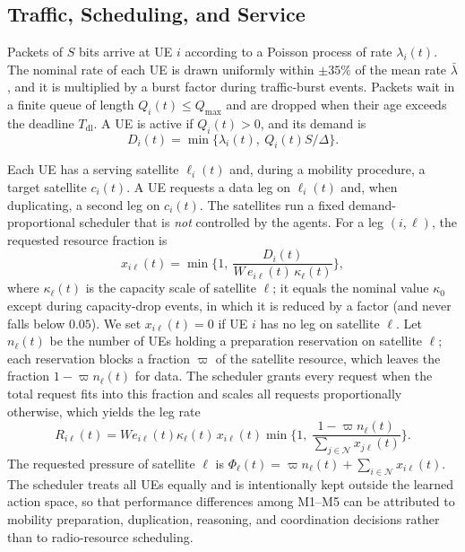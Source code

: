 \documentclass[journal]{IEEEtran}
\newcommand{\Nset}{\mathcal{N}}
\begin{document}
\subsection{Traffic, Scheduling, and Service}

Packets of $S$ bits arrive at UE $i$ according to a Poisson process of rate
$\lambda_i(t)$. The nominal rate of each UE is drawn uniformly within $\pm35\%$
of the mean rate $\bar\lambda$, and it is multiplied by a burst factor during
traffic-burst events. Packets wait in a finite queue of length
$Q_i(t)\le Q_{\max}$ and are dropped when their age exceeds the deadline
$T_{\mathrm{dl}}$. A UE is active if $Q_i(t)>0$, and its demand is
\begin{equation}
D_i(t)=\min\big\{\lambda_i(t),\ Q_i(t)S/\Delta\big\}.
\end{equation}

Each UE has a serving satellite $\ell_i(t)$ and, during a mobility procedure,
a target satellite $c_i(t)$. A UE requests a data leg on $\ell_i(t)$ and, when
duplicating, a second leg on $c_i(t)$. The satellites run a fixed
demand-proportional scheduler that is \emph{not} controlled by the agents.
For a leg $(i,\ell)$, the requested resource fraction is
\begin{equation}
x_{i\ell}(t)=\min\Big\{1,\ \frac{D_i(t)}{W\,e_{i\ell}(t)\,\kappa_\ell(t)}\Big\},
\end{equation}
where $\kappa_\ell(t)$ is the capacity scale of satellite $\ell$; it equals
the nominal value $\kappa_0$ except during capacity-drop events, in which it
is reduced by a factor (and never falls below $0.05$). We set $x_{i\ell}(t)=0$
if UE $i$ has no leg on satellite $\ell$. Let $n_\ell(t)$ be the number of
UEs holding a preparation reservation on satellite $\ell$; each reservation
blocks a fraction $\varpi$ of the satellite resource, which leaves the
fraction $1-\varpi n_\ell(t)$ for data. The scheduler grants every request
when the total request fits into this fraction and scales all requests
proportionally otherwise, which yields the leg rate
\begin{equation}
R_{i\ell}(t)=W e_{i\ell}(t)\kappa_\ell(t)\,x_{i\ell}(t)\min\Big\{1,\ \frac{1-\varpi n_\ell(t)}{\sum_{j\in\Nset}x_{j\ell}(t)}\Big\}.
\end{equation}
The requested pressure of satellite $\ell$ is
$\Phi_\ell(t)=\varpi n_\ell(t)+\sum_{i\in\Nset}x_{i\ell}(t)$. The scheduler
treats all UEs equally and is intentionally kept outside the learned action
space, so that performance differences among M1--M5 can be attributed to
mobility preparation, duplication, reasoning, and coordination decisions
rather than to radio-resource scheduling.
\end{document}
